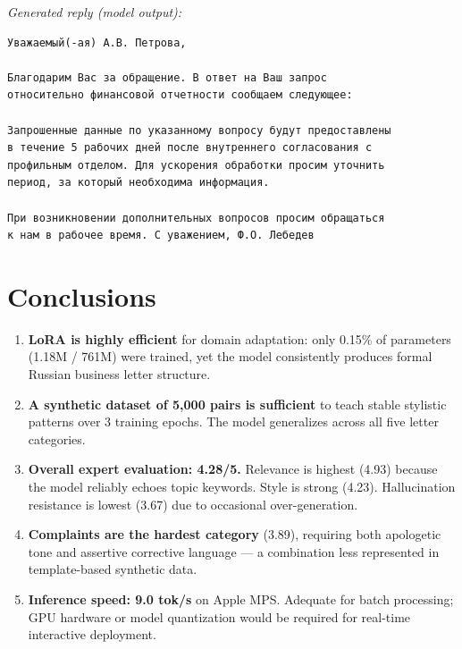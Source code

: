 \documentclass[12pt,a4paper]{article}
\begin{document}
\textit{Generated reply (model output):}
\begin{lstlisting}
Уважаемый(-ая) А.В. Петрова,

Благодарим Вас за обращение. В ответ на Ваш запрос
относительно финансовой отчетности сообщаем следующее:

Запрошенные данные по указанному вопросу будут предоставлены
в течение 5 рабочих дней после внутреннего согласования с
профильным отделом. Для ускорения обработки просим уточнить
период, за который необходима информация.

При возникновении дополнительных вопросов просим обращаться
к нам в рабочее время. С уважением, Ф.О. Лебедев
\end{lstlisting}

\section{Conclusions}

\begin{enumerate}
  \item \textbf{LoRA is highly efficient} for domain adaptation: only 0.15\% of parameters (1.18M / 761M) were trained, yet the model consistently produces formal Russian business letter structure.
  \item \textbf{A synthetic dataset of 5,000 pairs is sufficient} to teach stable stylistic patterns over 3 training epochs. The model generalizes across all five letter categories.
  \item \textbf{Overall expert evaluation: 4.28/5.} Relevance is highest (4.93) because the model reliably echoes topic keywords. Style is strong (4.23). Hallucination resistance is lowest (3.67) due to occasional over-generation.
  \item \textbf{Complaints are the hardest category} (3.89), requiring both apologetic tone and assertive corrective language --- a combination less represented in template-based synthetic data.
  \item \textbf{Inference speed: 9.0 tok/s} on Apple MPS. Adequate for batch processing; GPU hardware or model quantization would be required for real-time interactive deployment.
\end{enumerate}
\end{document}
